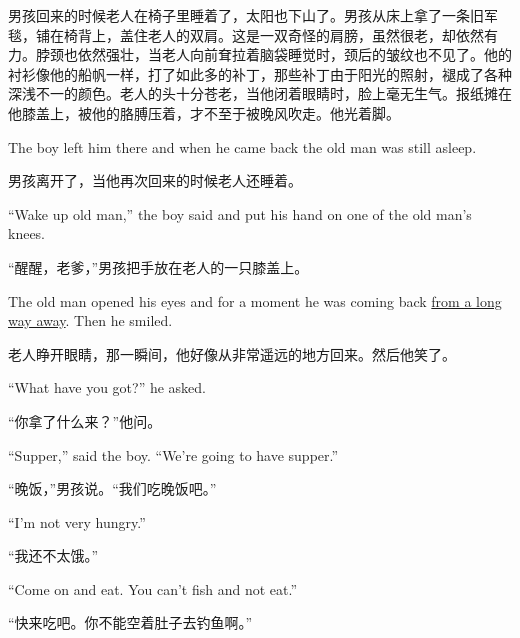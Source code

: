 \begin{paracol}{2}
\switchcolumn

男孩回来的时候老人在椅子里睡着了，太阳也下山了。男孩从床上拿了一条旧军毯，铺在椅背上，盖住老人的双肩。这是一双奇怪的肩膀，虽然很老，却依然有力。脖颈也依然强壮，当老人向前耷拉着脑袋睡觉时，颈后的皱纹也不见了。他的衬衫像他的船帆一样，打了如此多的补丁，那些补丁由于阳光的照射，褪成了各种深浅不一的颜色。老人的头十分苍老，当他闭着眼睛时，脸上毫无生气。报纸摊在他膝盖上，被他的胳膊压着，才不至于被晚风吹走。他光着脚。

\switchcolumn*

The boy left him there and when he came back the old man was still asleep.

\switchcolumn

男孩离开了，当他再次回来的时候老人还睡着。

\switchcolumn*

``Wake up old man,'' the boy said and put his hand on one of the old man's
knees.

\switchcolumn

“醒醒，老爹，”男孩把手放在老人的一只膝盖上。

\switchcolumn*

The old man opened his eyes and for a moment he was coming back \uline{from
  a long way away}. Then he smiled.

\switchcolumn

老人睁开眼睛，那一瞬间，他好像从非常遥远的地方回来。然后他笑了。

\switchcolumn*

``What have you got?'' he asked.

\switchcolumn

“你拿了什么来？”他问。

\switchcolumn*

``Supper,'' said the boy. ``We're going to have supper.''

\switchcolumn

“晚饭，”男孩说。“我们吃晚饭吧。”

\switchcolumn*

``I'm not very hungry.''

\switchcolumn

“我还不太饿。”

\switchcolumn*

``Come on and eat. You can't fish and not eat.''

\switchcolumn

“快来吃吧。你不能空着肚子去钓鱼啊。”

\switchcolumn*


\end{paracol}
